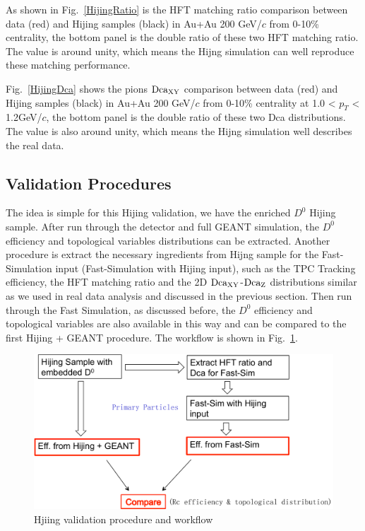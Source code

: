 \documentclass[a4paper]{article}
\begin{document}
As shown in Fig.~\ref{HijingRatio} is the HFT matching ratio comparison between data (red) and Hijing samples (black) in Au+Au 200 GeV/$c$ from 0-10\% centrality, the bottom panel is the double ratio of these two HFT matching ratio. The value is around unity, which means the Hijng simulation can well reproduce these matching performance. 

Fig.~\ref{HijingDca} shows the pions $\textup{Dca}_{\textup{XY}}$ comparison between data (red) and Hijing samples (black) in Au+Au 200 GeV/$c$ from 0-10\% centrality at 1.0 < $p_T$ < 1.2GeV/$c$, the bottom panel is the double ratio of these two Dca distributions. The value is also around unity, which means the Hijng simulation well describes the real data.

\subsection{Validation Procedures}
\label{validationprocedure}

The idea is simple for this Hijing validation, we have the enriched $D^0$ Hijing sample. After run through the detector and full GEANT simulation, the $D^0$ efficiency and topological variables distributions can be extracted. Another procedure is extract the necessary ingredients from Hijng sample for the Fast-Simulation input (Fast-Simulation with Hijing input), such as the TPC Tracking efficiency, the HFT matching ratio and the 2D $\textup{Dca}_\textup{XY}$-$\textup{Dca}_\textup{Z}$ distributions similar as we used in real data analysis and discussed in the previous section. Then run through the Fast Simulation, as discussed before, the $D^0$ efficiency and topological variables are also available in this way and can be compared to the first Hijing + GEANT procedure. The workflow is shown in Fig.~\ref{validation0}.

\begin{figure}[htbp]
\centering
\includegraphics[keepaspectratio,width=1.0\textwidth]{fig/validation0.pdf}
\caption{Hjiing validation procedure and workflow}
\label{validation0}
\end{figure}
\end{document}

